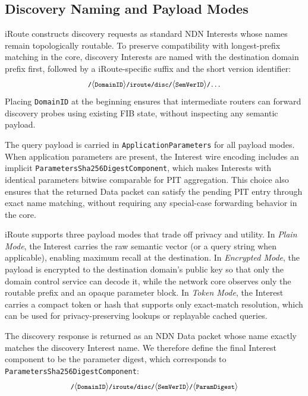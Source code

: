 \documentclass[conference]{IEEEtran}
\newcommand{\sysname}{iRoute}
\newcommand{\PSDC}{\texttt{ParametersSha256Digest\allowbreak Component}}
\begin{document}
\subsection{Discovery Naming and Payload Modes}
\label{sec:spec_naming}

\sysname{} constructs discovery requests as standard NDN Interests whose names remain topologically routable.
To preserve compatibility with longest-prefix matching in the core, discovery Interests are named with the destination domain prefix first, followed by a \sysname{}-specific suffix and the short version identifier:
{\setlength{\abovedisplayskip}{2pt}\setlength{\belowdisplayskip}{2pt}
\begin{equation*}
\footnotesize
\texttt{/}\allowbreak\langle \texttt{DomainID} \rangle
\texttt{/iroute/disc/}\allowbreak\langle \texttt{SemVerID} \rangle
\texttt{/...}
\end{equation*}}
Placing \texttt{DomainID} at the beginning ensures that intermediate routers can forward discovery probes using existing FIB state, without inspecting any semantic payload.

The query payload is carried in \texttt{ApplicationPara\-meters} for all payload modes. When application parameters are present, the Interest wire encoding includes an implicit \PSDC, which makes Interests with identical parameters bitwise comparable for PIT aggregation.
This choice also ensures that the returned Data packet can satisfy the pending PIT entry through exact name matching, without requiring any special-case forwarding behavior in the core.

\sysname{} supports three payload modes that trade off privacy and utility.
In \emph{Plain Mode}, the Interest carries the raw semantic vector (or a query string when applicable), enabling maximum recall at the destination.
In \emph{Encrypted Mode}, the payload is encrypted to the destination domain's public key so that only the domain control service can decode it, while the network core observes only the routable prefix and an opaque parameter block.
In \emph{Token Mode}, the Interest carries a compact token or hash that supports only exact-match resolution, which can be used for privacy-preserving lookups or replayable cached queries.

The discovery response is returned as an NDN Data packet whose name exactly matches the discovery Interest name.
We therefore define the final Interest component to be the parameter digest, which corresponds to \PSDC:
{\setlength{\abovedisplayskip}{2pt}\setlength{\belowdisplayskip}{2pt}
\begin{equation*}
\footnotesize
\texttt{/}\allowbreak\langle \texttt{DomainID} \rangle
\texttt{/iroute/disc/}\allowbreak\langle \texttt{SemVerID} \rangle
\texttt{/}\allowbreak\langle \texttt{ParamDigest} \rangle
\end{equation*}}
\end{document}
